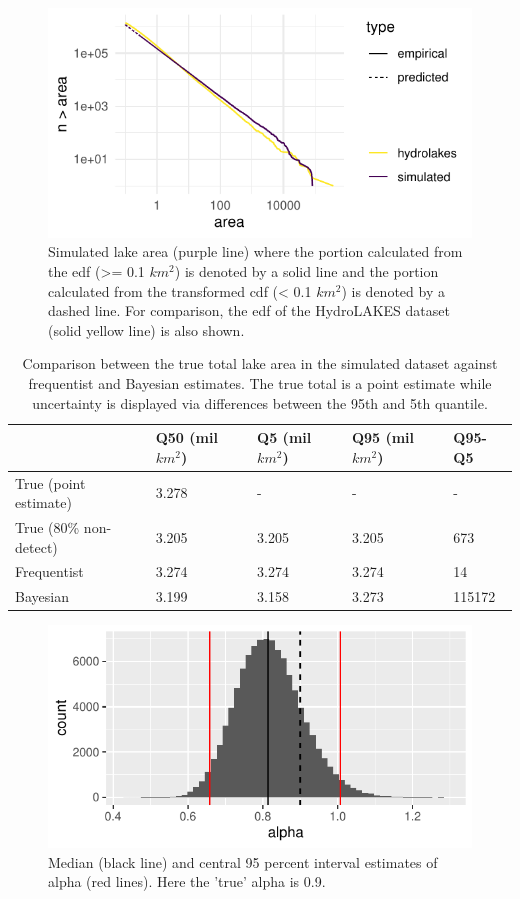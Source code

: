 \documentclass{article}
\begin{document}
\begin{figure}
	\centering
	\includegraphics{figures/predict_censor-1}
	\caption{Simulated lake area (purple line) where the portion calculated from the edf (>= 0.1 $km^2$) is denoted by a solid line and the portion calculated from the transformed cdf (< 0.1 $km^2$) is denoted by a dashed line. For comparison, the edf of the HydroLAKES dataset (solid yellow line) is also shown.}
	\label{fig:predict_censor}
\end{figure}

\begin{table}
	\caption{Comparison between the true total lake area in the simulated dataset against frequentist and Bayesian estimates. The true total is a point estimate while uncertainty is displayed via differences between the 95th and 5th quantile.}
	\centering
	\begin{tabular}{lllll}
		\toprule
		& Q50 (mil $km^2$) & Q5 (mil $km^2$) & Q95 (mil $km^2$) & Q95-Q5 \\
		\midrule
		True (point estimate) & 3.278 & - & - & - \\
		True (80\% non-detect) & 3.205 & 3.205 & 3.205 & 673  \\
		Frequentist & 3.274 & 3.274 & 3.274 & 14  \\
		Bayesian & 3.199 & 3.158 & 3.273 & 115172 \\
		\bottomrule
	   \end{tabular}	
	\label{tab:area}
\end{table}

\begin{figure}
	\centering
	\includegraphics{figures/bayesian_model-1}
	\caption{Median (black line) and central 95 percent interval estimates of alpha (red lines). Here the 'true' alpha is 0.9.}
	\label{fig:bayesian_model}
\end{figure}
\end{document}
